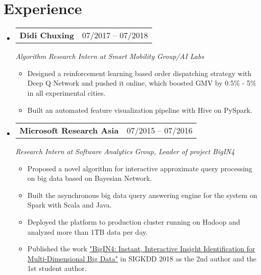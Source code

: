 \documentclass[a4paper,11pt]{article}
\makeatletter
\newcommand{\resumeItem}[1]{
  \item\small{#1 \vspace{-2pt}}
}
\newcommand{\resumeSubheading}[3]{
  \vspace{-1pt}\item
    \begin{tabular*}{0.97\textwidth}{l@{\extracolsep{\fill}}r}
      \textbf{#1} & #2
      \end{tabular*}
      \textit{\small#3}
}
\newcommand{\resumeItemListStart}{\begin{itemize}[leftmargin=*, topsep=0ex]}
\newcommand{\resumeItemListEnd}{\end{itemize}}
\makeatother
\begin{document}
\section{Experience}
  \begin{itemize}[leftmargin=*, itemsep=5pt, label={}]

    \resumeSubheading
      {Didi Chuxing}{07/2017 -- 07/2018}
      {Algorithm Research Intern at Smart Mobility Group/AI Labs}
      \resumeItemListStart
        \resumeItem
        {Designed a reinforcement learning based order dispatching strategy with Deep Q Network and pushed it online, which boosted GMV by 0.5\% - 5\% in all experimental cities.}
        \resumeItem
        {Built an automated feature visualization pipeline with Hive on PySpark.}
    \resumeItemListEnd
      
    \resumeSubheading
      {Microsoft Research Asia}{07/2015 -- 07/2016}
      {Research Intern at Software Analytics Group, Leader of project BigIN4}
      \resumeItemListStart
        \resumeItem
        {Proposed a novel algorithm for interactive approximate query processing on big data based on Bayesian Network.}
        \resumeItem
        {Built the asynchronous big data query answering engine for the system on Spark with Scala and Java.}
        \resumeItem
        {Deployed the platform to production cluster running on Hadoop and analyzed more than 1TB data per day.}
        \resumeItem
        {Published the work \href{http://www.kdd.org/kdd2018/accepted-papers/view/bigin4-instant-interactive-insight-identification-for-multi-dimensional-big}{"BigIN4: Instant, Interactive Insight Identification for Multi-Dimensional Big Data"} in SIGKDD 2018 as the 2nd author and the 1st student author.}
      \resumeItemListEnd
  \end{itemize}
  
\end{document}
